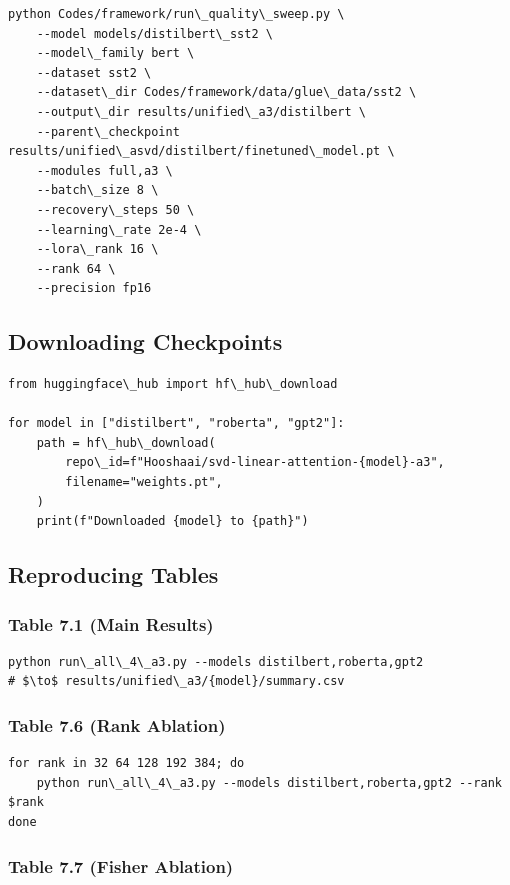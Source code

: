 \begin{lstlisting}
python Codes/framework/run\_quality\_sweep.py \
    --model models/distilbert\_sst2 \
    --model\_family bert \
    --dataset sst2 \
    --dataset\_dir Codes/framework/data/glue\_data/sst2 \
    --output\_dir results/unified\_a3/distilbert \
    --parent\_checkpoint results/unified\_asvd/distilbert/finetuned\_model.pt \
    --modules full,a3 \
    --batch\_size 8 \
    --recovery\_steps 50 \
    --learning\_rate 2e-4 \
    --lora\_rank 16 \
    --rank 64 \
    --precision fp16
\end{lstlisting}

\subsection{Downloading Checkpoints}

\begin{lstlisting}
from huggingface\_hub import hf\_hub\_download

for model in ["distilbert", "roberta", "gpt2"]:
    path = hf\_hub\_download(
        repo\_id=f"Hooshaai/svd-linear-attention-{model}-a3",
        filename="weights.pt",
    )
    print(f"Downloaded {model} to {path}")
\end{lstlisting}

\subsection{Reproducing Tables}

\subsubsection{Table 7.1 (Main Results)}

\begin{lstlisting}
python run\_all\_4\_a3.py --models distilbert,roberta,gpt2
# $\to$ results/unified\_a3/{model}/summary.csv
\end{lstlisting}

\subsubsection{Table 7.6 (Rank Ablation)}

\begin{lstlisting}
for rank in 32 64 128 192 384; do
    python run\_all\_4\_a3.py --models distilbert,roberta,gpt2 --rank $rank
done
\end{lstlisting}

\subsubsection{Table 7.7 (Fisher Ablation)}

